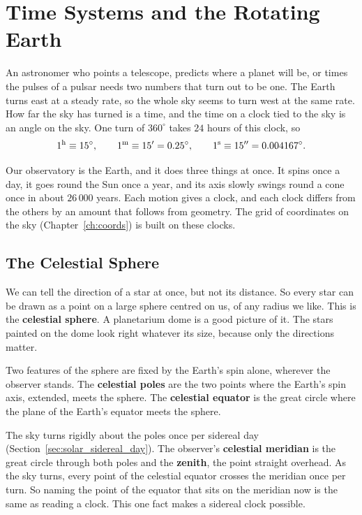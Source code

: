 \chapter{Time Systems and the Rotating Earth}
\label{ch:time}

An astronomer who points a telescope, predicts where a planet will be, or times the pulses of a pulsar needs two numbers that turn out to be one. The Earth turns east at a steady rate, so the whole sky seems to turn west at the same rate. How far the sky has turned is a time, and the time on a clock tied to the sky is an angle on the sky. One turn of $360^\circ$ takes $24$ hours of this clock, so
\begin{equation}
	1^{\rm h} \equiv 15^\circ, \qquad 1^{\rm m} \equiv 15' = 0.25^\circ, \qquad 1^{\rm s} \equiv 15'' = 0.004167^\circ.
	\label{eq:time_angle_conversion}
\end{equation}

Our observatory is the Earth, and it does three things at once. It spins once a day, it goes round the Sun once a year, and its axis slowly swings round a cone once in about $26\,000$ years. Each motion gives a clock, and each clock differs from the others by an amount that follows from geometry. The grid of coordinates on the sky (Chapter~\ref{ch:coords}) is built on these clocks.

\section{The Celestial Sphere}
\label{sec:celestial_sphere_primer}

We can tell the direction of a star at once, but not its distance. So every star can be drawn as a point on a large sphere centred on us, of any radius we like. This is the \textbf{celestial sphere}. A planetarium dome is a good picture of it. The stars painted on the dome look right whatever its size, because only the directions matter.

Two features of the sphere are fixed by the Earth's spin alone, wherever the observer stands. The \textbf{celestial poles} are the two points where the Earth's spin axis, extended, meets the sphere. The \textbf{celestial equator} is the great circle where the plane of the Earth's equator meets the sphere.

The sky turns rigidly about the poles once per sidereal day (Section~\ref{sec:solar_sidereal_day}). The observer's \textbf{celestial meridian} is the great circle through both poles and the \textbf{zenith}, the point straight overhead. As the sky turns, every point of the celestial equator crosses the meridian once per turn. So naming the point of the equator that sits on the meridian now is the same as reading a clock. This one fact makes a sidereal clock possible.

